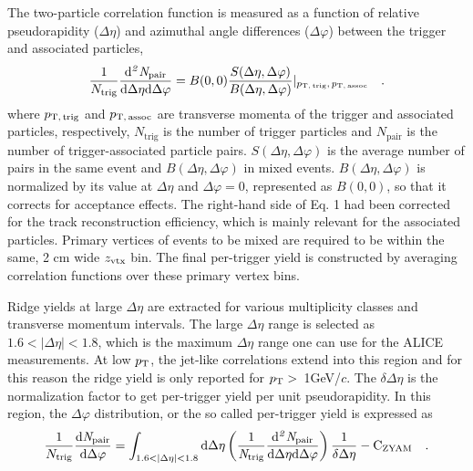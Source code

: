 The two-particle correlation function is measured as a function of relative pseudorapidity ($\Delta\eta$) and azimuthal angle differences ($\Delta\varphi$) between the trigger and associated particles,
\begin{eqnarray}
\frac{1}{N_{\rm{trig}}} \frac{ \rm{d}\it{}^{2} N_{\rm{pair}} }{ \rm{d} \Delta\eta \rm{d}\Delta\varphi} = B(0, 0)\frac{S(\Delta\eta, \Delta\varphi)}{B(\Delta\eta, \Delta\varphi)}  \lvert_{p_\mathrm{T,\,trig},\,p_\mathrm{T,\,assoc}}  \quad.
\label{eq:corrfunction}
\end{eqnarray}
where $p_\mathrm{T,\,trig}$ and $p_\mathrm{T,\,assoc}$ are transverse momenta of the trigger and associated particles, respectively, $N_\mathrm{trig}$ is the number of trigger particles and $N_\mathrm{pair}$ is the number of trigger-associated particle pairs. 
$S (\Delta\eta, \Delta\varphi)$ is the average number of pairs in the same event and $B(\Delta\eta, \Delta\varphi)$ in mixed events. $B(\Delta\eta, \Delta\varphi)$ is normalized by its value at $\Delta\eta$ and $\Delta\varphi = 0$, represented as $B (0,0)$, so that it corrects for acceptance effects. The right-hand side of Eq. 1 had been corrected for the track reconstruction efficiency, which is mainly relevant for the associated particles. Primary vertices of events to be mixed are required to be within the same, 2 cm wide $z_{\rm{vtx}}$ bin. The final per-trigger yield is constructed by averaging correlation functions over these primary vertex bins.

Ridge yields at large $\Delta\eta$ are extracted for various multiplicity classes and transverse momentum intervals. The large $\Delta\eta$ range is selected as $1.6<|\Delta\eta|<1.8$,  which is the maximum $\Delta\eta$ range one can use for the ALICE measurements. At low $p_\mathrm{T}$, the jet-like correlations extend into this region and for this reason the ridge yield is only reported for $p_\mathrm{T}>$~1GeV/$c$. The $\delta\Delta\eta$ is the normalization factor to get per-trigger yield per unit pseudorapidity. In this region, the $\Delta\varphi$ distribution, or the so called per-trigger yield is expressed as
\begin{eqnarray}
\frac{1}{N_{\rm{trig}}} \frac{ \rm{d}\it{}N_{\rm{pair}} }{ \rm{d}\Delta\varphi } = \int_{1.6<|\Delta \eta|<1.8} \rm{d} \Delta \eta \left( \frac{1}{\it{N}_{\rm{trig}}} \frac{ \rm{d}\it{}^{2} N_{\rm{pair}} }{ \rm{d}\Delta\eta d\Delta\varphi} \right) \dfrac{1}{\delta\Delta\eta} - C_{\rm{ZYAM}} \quad.
\end{eqnarray}

